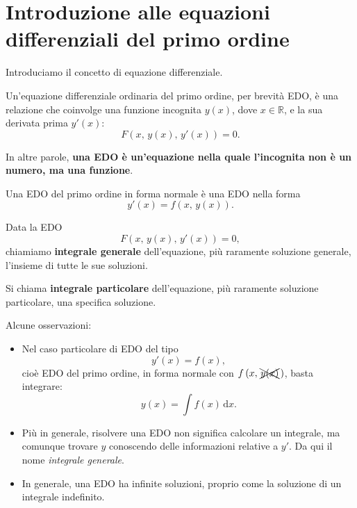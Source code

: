 \documentclass[../../analisi2]{subfiles}
\begin{document}
    \chapter{Introduzione alle equazioni differenziali del primo ordine}

        Introduciamo il concetto di equazione differenziale.

        \begin{definizione}
            Un'equazione differenziale ordinaria del primo ordine, per brevità EDO, è una relazione che coinvolge una funzione incognita
            \(y(x)\), dove \(x \in \mathbb{R}\), e la sua derivata prima \(y'(x)\):
            \[
                F\left(x, \, y(x), \, y'(x)\right) = 0.
            \]

            In altre parole, \textbf{una EDO è un'equazione nella quale l'incognita non è un numero, ma una funzione}.
        \end{definizione}

        \begin{definizione}
            Una EDO del primo ordine in forma normale è una EDO nella forma
            \[
                y'(x) = f\left(x, \, y(x)\right).
            \]
        \end{definizione}

        \begin{definizione}
            Data la EDO
            \[
                F\left(x, \, y(x), \, y'(x)\right) = 0,
            \]
            chiamiamo \textbf{integrale generale} dell'equazione, più raramente soluzione generale, l'insieme di tutte le sue soluzioni.

            Si chiama \textbf{integrale particolare} dell'equazione, più raramente soluzione particolare, una specifica soluzione.
        \end{definizione}

        Alcune osservazioni:
        \begin{itemize}
            \item Nel caso particolare di EDO del tipo
                \[
                    y'(x) = f(x),
                \]
                cioè EDO del primo ordine, in forma normale con \(f\left(x, \, \xcancel{y(x)} \, \right)\), basta integrare:
                \[
                    y(x) = \int \! f(x) \, \mathrm{d}x.
                \]
            \item Più in generale, risolvere una EDO non significa calcolare un integrale, ma comunque trovare \(y\) conoscendo delle
                informazioni relative a \(y'\). Da qui il nome \emph{integrale generale}.
            \item In generale, una EDO ha infinite soluzioni, proprio come la soluzione di un integrale indefinito.
        \end{itemize}
            
\end{document}

